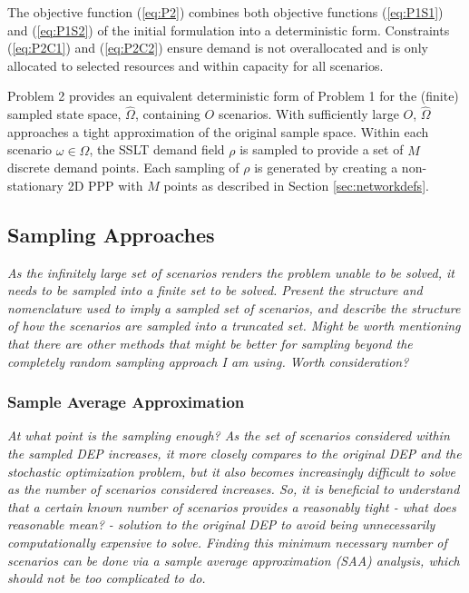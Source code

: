 \documentclass[12pt,dvipsnames]{report}
\begin{document}
The objective function (\ref{eq:P2}) combines both objective functions (\ref{eq:P1S1}) and (\ref{eq:P1S2}) of the initial formulation into a deterministic form.  Constraints (\ref{eq:P2C1}) and (\ref{eq:P2C2})	ensure demand is not overallocated and is only allocated to selected resources and within capacity for all scenarios.

Problem 2 provides an equivalent deterministic form of Problem 1 for the (finite) sampled state space, $\hat{\Omega}$, containing $O$ scenarios.  With sufficiently large $O$, $\hat{\Omega}$ approaches a tight approximation of the original sample space.  Within each scenario $\omega \in \hat{\Omega}$, the SSLT demand field $\rho$ is sampled to provide a set of $M$ discrete demand points.  Each sampling of $\rho$ is generated by creating a non-stationary 2D PPP with $M$ points as described in Section \ref{sec:networkdefs}.

\subsection{Sampling Approaches} \label{subsec:dep_sampling}

\textit{As the infinitely large set of scenarios renders the problem unable to be solved, it needs to be sampled into a finite set to be solved.  Present the structure and nomenclature used to imply a sampled set of scenarios, and describe the structure of how the scenarios are sampled into a truncated set.  Might be worth mentioning that there are other methods that might be better for sampling beyond the completely random sampling approach I am using.  Worth consideration?}

\subsubsection{Sample Average Approximation} \label{subsubsec:dep_sampling_saa}

\textit{At what point is the sampling enough?  As the set of scenarios considered within the sampled DEP increases, it more closely compares to the original DEP and the stochastic optimization problem, but it also becomes increasingly difficult to solve as the number of scenarios considered increases.  So, it is beneficial to understand that a certain known number of scenarios provides a reasonably tight - what does reasonable mean? - solution to the original DEP to avoid being unnecessarily computationally expensive to solve.  Finding this minimum necessary number of scenarios can be done via a sample average approximation (SAA) analysis, which should not be too complicated to do.}
\end{document}
